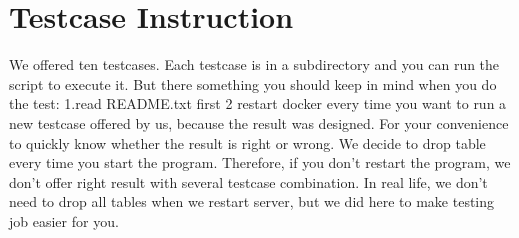 \documentclass{article}
\begin{document}
\section{Testcase Instruction}
We offered ten testcases. Each testcase is in a subdirectory and you can run the script to execute it. But there something you should keep in mind when you do the test: 1.read README.txt first 2 restart docker every time you want to run a new testcase offered by us, because the result was designed. For your convenience to quickly know whether the result is right or wrong. We decide to drop table every time you start the program. Therefore, if you don't restart the program, we don't offer right result with several testcase combination. In real life, we don't need to drop all tables when we restart server, but we did here to make testing job easier for you.

%
\end{document}
